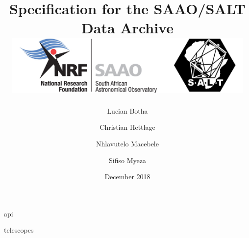 \documentclass[12pt]{article}
\begin{document}
\begin{titlepage}
\title[SAAO/SALT Data Archive]{Specification for the SAAO/SALT Data Archive\\[2em]\includegraphics[width=14cm,height=3cm,keepaspectratio]{SAAO_SALT_Logos.png}\\[2em]}

\author[Lucian Botha et al.]{Lucian Botha \and Christian Hettlage \and Nhlavutelo Macebele \and Sifiso Myeza}

\date{December 2018}


\vfill

\end{titlepage}


\printglossary[type=\acronymtype]

\printglossary

{api}

\appendix

{telescopes}

\label{lastpage}
\end{document}
